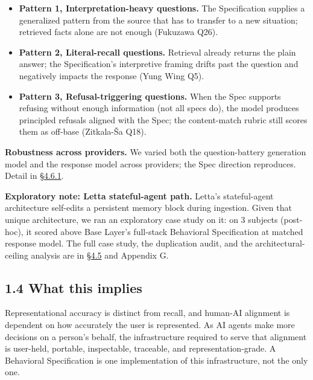 \begin{itemize}
\tightlist
\item
  \textbf{Pattern 1, Interpretation-heavy questions.} The Specification
  supplies a generalized pattern from the source that has to transfer to
  a new situation; retrieved facts alone are not enough (Fukuzawa Q26).
\item
  \textbf{Pattern 2, Literal-recall questions.} Retrieval already
  returns the plain answer; the Specification's interpretive framing
  drifts past the question and negatively impacts the response (Yung
  Wing Q5).
\item
  \textbf{Pattern 3, Refusal-triggering questions.} When the Spec
  supports refusing without enough information (not all specs do), the
  model produces principled refusals aligned with the Spec; the
  content-match rubric still scores them as off-base (Zitkala-Ša Q18).
\end{itemize}

\textbf{Robustness across providers.} We varied both the
question-battery generation model and the response model across
providers; the Spec direction reproduces. Detail in \hyperref[cross-provider-response-generation-tier-2-replication]{§4.6.1}.

\textbf{Exploratory note: Letta stateful-agent path.} Letta's
stateful-agent architecture self-edits a persistent memory block during
ingestion. Given that unique architecture, we ran an exploratory case
study on it: on 3 subjects (post-hoc), it scored above Base Layer's
full-stack Behavioral Specification at matched response model. The full
case study, the duplication audit, and the architectural-ceiling
analysis are in \hyperref[exploratory-case-study-letta-stateful-agent-n3-post-hoc]{§4.5} and Appendix G.

\hypertarget{what-this-implies}{%
\subsection{1.4 What this implies}\label{what-this-implies}}

Representational accuracy is distinct from recall, and human-AI
alignment is dependent on how accurately the user is represented. As AI
agents make more decisions on a person's behalf, the infrastructure
required to serve that alignment is user-held, portable, inspectable,
traceable, and representation-grade. A Behavioral Specification is one
implementation of this infrastructure, not the only one.

